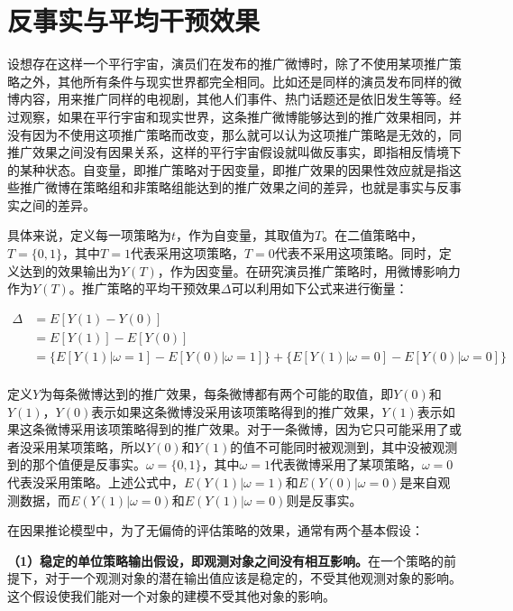 \section{反事实与平均干预效果}

设想存在这样一个平行宇宙，演员们在发布的推广微博时，除了不使用某项推广策略之外，其他所有条件与现实世界都完全相同。比如还是同样的演员发布同样的微博内容，用来推广同样的电视剧，其他人们事件、热门话题还是依旧发生等等。经过观察，如果在平行宇宙和现实世界，这条推广微博能够达到的推广效果相同，并没有因为不使用这项推广策略而改变，那么就可以认为这项推广策略是无效的，同推广效果之间没有因果关系，这样的平行宇宙假设就叫做反事实，即指相反情境下的某种状态\cite{倾向值匹配与因果推论}。自变量，即推广策略对于因变量，即推广效果的因果性效应就是指这些推广微博在策略组和非策略组能达到的推广效果之间的差异，也就是事实与反事实之间的差异。

具体来说，定义每一项策略为$t$，作为自变量，其取值为$T$。在二值策略中，$T=\{0,1\}$，其中$T=1$代表采用这项策略，$T=0$代表不采用这项策略。同时，定义达到的效果输出为$Y(T)$，作为因变量。在研究演员推广策略时，用微博影响力作为$Y(T)$。推广策略的平均干预效果$\Delta$可以利用如下公式来进行衡量：

\begin{equation}
\begin{split}
\Delta &= E[Y(1) - Y(0)] \\
&= E[Y(1)] - E[Y(0)] \\
&=\{E[Y(1)|\omega=1]-E[Y(0)|\omega=1]\}+\{E[Y(1)|\omega=0]-E[Y(0)|\omega=0]\}\\
\end{split}
\end{equation}

定义$Y$为每条微博达到的推广效果，每条微博都有两个可能的取值，即$Y(0)$和$Y(1)$，$Y(0)$表示如果这条微博没采用该项策略得到的推广效果，$Y(1)$表示如果这条微博采用该项策略得到的推广效果。对于一条微博，因为它只可能采用了或者没采用某项策略，所以$Y(0)$和$Y(1)$的值不可能同时被观测到，其中没被观测到的那个值便是反事实。$\omega=\{0,1\}$，其中$\omega=1$代表微博采用了某项策略，$\omega=0$代表没采用策略。上述公式中，$E(Y(1)|\omega=1)$和$E(Y(0)|\omega=0)$是来自观测数据，而$E(Y(1)|\omega=0)$和$E(Y(1)|\omega=0)$则是反事实。

在因果推论模型中，为了无偏倚的评估策略的效果，通常有两个基本假设：

\textbf{（1）稳定的单位策略输出假设，即观测对象之间没有相互影响。}在一个策略的前提下，对于一个观测对象的潜在输出值应该是稳定的，不受其他观测对象的影响。这个假设使我们能对一个对象的建模不受其他对象的影响。


